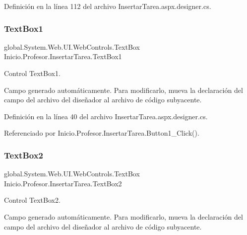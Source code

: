 Definición en la línea 112 del archivo Insertar\+Tarea.\+aspx.\+designer.\+cs.

\mbox{\label{classInicio_1_1Profesor_1_1InsertarTarea_a606f1270a89d222d8a929f5ddae79988}} 
\subsubsection{\texorpdfstring{TextBox1}{TextBox1}}
{\footnotesize\ttfamily global.\+System.\+Web.\+U\+I.\+Web\+Controls.\+Text\+Box Inicio.\+Profesor.\+Insertar\+Tarea.\+Text\+Box1\hspace{0.3cm}{\ttfamily [protected]}}



Control Text\+Box1. 

Campo generado automáticamente. Para modificarlo, mueva la declaración del campo del archivo del diseñador al archivo de código subyacente. 

Definición en la línea 40 del archivo Insertar\+Tarea.\+aspx.\+designer.\+cs.



Referenciado por Inicio.\+Profesor.\+Insertar\+Tarea.\+Button1\+\_\+\+Click().

\mbox{\label{classInicio_1_1Profesor_1_1InsertarTarea_a55b3f89405ded6d43d46e28dfbec3326}} 
\subsubsection{\texorpdfstring{TextBox2}{TextBox2}}
{\footnotesize\ttfamily global.\+System.\+Web.\+U\+I.\+Web\+Controls.\+Text\+Box Inicio.\+Profesor.\+Insertar\+Tarea.\+Text\+Box2\hspace{0.3cm}{\ttfamily [protected]}}



Control Text\+Box2. 

Campo generado automáticamente. Para modificarlo, mueva la declaración del campo del archivo del diseñador al archivo de código subyacente. 

